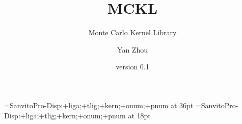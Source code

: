 %
%
%
%

\begingroup
\font\titlefont=SanvitoPro-Disp:+liga;+tlig;+kern;+onum;+pnum at 36pt
\font\authorfont=SanvitoPro-Disp:+liga;+tlig;+kern;+onum;+pnum at 18pt
\title{\titlefont MCKL}
\subtitle{\titlefont Monte Carlo Kernel Library}
\author{\authorfont Yan Zhou}
\date{\authorfont version 0.1}
\maketitle
\endgroup

\tableofcontents

